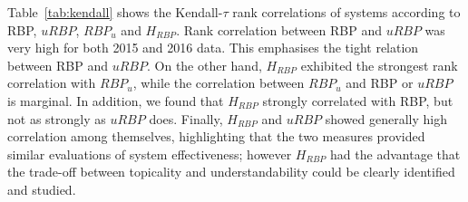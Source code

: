 
Table~\ref{tab:kendall} shows the Kendall-$\tau$ rank correlations of systems according to RBP, $uRBP$, $RBP_u$ and $H_{RBP}$. Rank correlation between RBP and $uRBP$ was very high for both 2015 and 2016 data. This emphasises the tight relation between RBP and $uRBP$. On the other hand, $H_{RBP}$ exhibited the strongest rank correlation with $RBP_u$, while the correlation between $RBP_u$ and RBP or $uRBP$ is marginal. In addition, we found that $H_{RBP}$ strongly correlated with RBP, but not as strongly as  $uRBP$ does. Finally, $H_{RBP}$ and $uRBP$ showed generally high correlation among themselves, highlighting that the two measures provided similar evaluations of system effectiveness; however $H_{RBP}$ had the advantage that the trade-off between topicality and understandability could be clearly identified and studied. 


 
